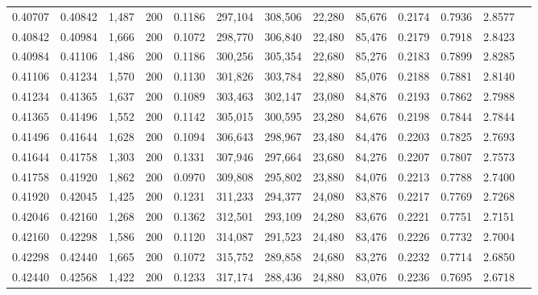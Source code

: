 \begin{tabular}{rrrrrrrrrrrrr}
0.40707 & 0.40842 & 1,487 & 200 &                                     0.1186 & 297,104 & 308,506 &  22,280 &  85,676 & 0.2174 & 0.7936 & 2.8577 \\
0.40842 & 0.40984 & 1,666 & 200 &                                     0.1072 & 298,770 & 306,840 &  22,480 &  85,476 & 0.2179 & 0.7918 & 2.8423 \\
0.40984 & 0.41106 & 1,486 & 200 &                                     0.1186 & 300,256 & 305,354 &  22,680 &  85,276 & 0.2183 & 0.7899 & 2.8285 \\
0.41106 & 0.41234 & 1,570 & 200 &                                     0.1130 & 301,826 & 303,784 &  22,880 &  85,076 & 0.2188 & 0.7881 & 2.8140 \\
0.41234 & 0.41365 & 1,637 & 200 &                                     0.1089 & 303,463 & 302,147 &  23,080 &  84,876 & 0.2193 & 0.7862 & 2.7988 \\
0.41365 & 0.41496 & 1,552 & 200 &                                     0.1142 & 305,015 & 300,595 &  23,280 &  84,676 & 0.2198 & 0.7844 & 2.7844 \\
0.41496 & 0.41644 & 1,628 & 200 &                                     0.1094 & 306,643 & 298,967 &  23,480 &  84,476 & 0.2203 & 0.7825 & 2.7693 \\
0.41644 & 0.41758 & 1,303 & 200 &                                     0.1331 & 307,946 & 297,664 &  23,680 &  84,276 & 0.2207 & 0.7807 & 2.7573 \\
0.41758 & 0.41920 & 1,862 & 200 &                                     0.0970 & 309,808 & 295,802 &  23,880 &  84,076 & 0.2213 & 0.7788 & 2.7400 \\
0.41920 & 0.42045 & 1,425 & 200 &                                     0.1231 & 311,233 & 294,377 &  24,080 &  83,876 & 0.2217 & 0.7769 & 2.7268 \\
0.42046 & 0.42160 & 1,268 & 200 &                                     0.1362 & 312,501 & 293,109 &  24,280 &  83,676 & 0.2221 & 0.7751 & 2.7151 \\
0.42160 & 0.42298 & 1,586 & 200 &                                     0.1120 & 314,087 & 291,523 &  24,480 &  83,476 & 0.2226 & 0.7732 & 2.7004 \\
0.42298 & 0.42440 & 1,665 & 200 &                                     0.1072 & 315,752 & 289,858 &  24,680 &  83,276 & 0.2232 & 0.7714 & 2.6850 \\
0.42440 & 0.42568 & 1,422 & 200 &                                     0.1233 & 317,174 & 288,436 &  24,880 &  83,076 & 0.2236 & 0.7695 & 2.6718 \\

\end{tabular}
